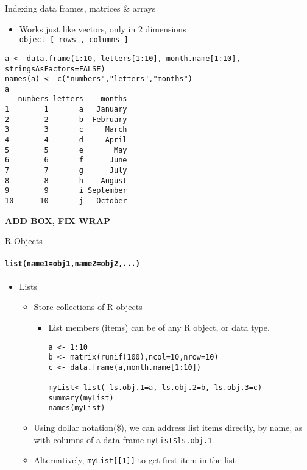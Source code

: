 \documentclass{beamer}
\begin{document}
\begin{frame}{Indexing data frames, matrices \& arrays}
    \begin{itemize}
        \item Works just like vectors, only in 2 dimensions \\
        {\tt object [ rows , columns ]}
    \end{itemize}
    \begin{verbatim}
a <- data.frame(1:10, letters[1:10], month.name[1:10], stringsAsFactors=FALSE)
names(a) <- c("numbers","letters","months")‏
a
   numbers letters    months
1        1       a   January
2        2       b  February
3        3       c     March
4        4       d     April
5        5       e       May
6        6       f      June
7        7       g      July
8        8       h    August
9        9       i September
10      10       j   October\end{verbatim}

\textbf{ADD BOX, FIX WRAP}
\end{frame}

\begin{frame}{R Objects}
    \framesubtitle{{\tt list(name1=obj1,name2=obj2,...)}}
    \begin{itemize}
        \item Lists
        \begin{itemize}
            \item Store collections of R objects
            \begin{itemize}
                \item List members (items) can be of any R object, or data type.
        \begin{verbatim}
a <- 1:10
b <- matrix(runif(100),ncol=10,nrow=10)
c <- data.frame(a,month.name[1:10])

myList<-list( ls.obj.1=a, ls.obj.2=b, ls.obj.3=c)
summary(myList)
names(myList)\end{verbatim}
            \end{itemize}
            \item Using dollar notation(\$), we can address list items directly, by name, as with columns of a data frame
            {\tt myList\$ls.obj.1}
            \item Alternatively, {\tt myList[[1]]} to get first item in the list
        \end{itemize}
    \end{itemize}
\end{frame}
\end{document}
